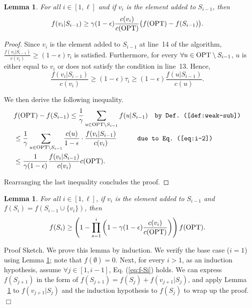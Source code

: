 \documentclass[10pt]{article} %
\newtheorem{lemma}[theorem]{Lemma}
\theoremstyle{remark}
\newcommand{\OPT}{{\rm OPT}}
\begin{document}
\begin{lemma}
\label{lem:marginal-gain}
For all $i \in [1,\ell]$ and if $v_i$ is the element added to $S_{i-1}$, then
\[ 
f(v_i|S_{i-1}) \geq \gamma(1-\epsilon) \frac{c(v_i)}{c(\OPT)} \big ( f(\OPT) - f(S_{i-1}) \big ). 
\]
\end{lemma}

\begin{proof} 
Since $v_i$ is the element added to $S_{i-1}$ at line~14 of the algorithm,
$\frac{f(v_i|S_{i-1})}{c(v_i)}\geq {(1-\epsilon)\tau_i}$ is satisfied. Furthermore, for every 
$\forall u\in \OPT \setminus S_{i-1}$, $u$ is either equal to $v_i$ or does not satisfy the condition in line~13. Hence, 
\begin{equation}
\frac{f(v_i|S_{i-1})}{c(v_i)}\geq {(1-\epsilon)\tau_i} \geq (1-\epsilon) \frac{f(u|S_{i-1})}{c(u)}.
\label{eq:i-2}
\end{equation}

We then derive the following inequality.
\begin{align*}
    & f(\OPT)-f(S_{i-1}) \leq \frac{1}{\gamma} \sum_{u\in \OPT \setminus S_{i-1}} f(u|S_{i-1}) \quad\mbox{\tt  by Def.~(\ref{def:weak-sub})} \\
    &\leq \frac{1}{\gamma} \sum_{u\in \OPT \setminus S_{i-1}} \frac{c(u)}{1-\epsilon} \cdot \frac{f(v_i|S_{i-1})}{c(v_i)}  \quad\quad\quad\mbox{\tt  due to Eq.~(\ref{eq:i-2})} \\
    &\leq \frac{1}{\gamma(1-\epsilon)} \frac{f(v_i|S_{i-1})}{c(v_i)} c(\OPT).
\end{align*}

Rearranging the last inequality concludes the proof.     
\end{proof}

\begin{lemma}
\label{lem:f-Si}
For all $i\in [1,\ell]$, if $v_i$ is the element added to $S_{i-1}$ and $f(S_{i})=f(S_{i-1} \cup \{v_i\})$, then
\begin{equation}
    \label{eq:f-Si}
    f(S_{i}) \geq \left(   1- \prod_{s=1}^{i} \left(1- \gamma(1-\epsilon) \frac{c(v_i)}{c(\OPT)} \right)   \right) f(\OPT).
\end{equation}
\end{lemma}

{\sc Proof Sketch.}
We prove this lemma by induction. We verify the base case ($i=1$) using Lemma \ref{lem:marginal-gain}; note that
$f(\emptyset) = 0$. Next, for every $i>1$, as an induction hypothesis, assume $\forall j \in [1, i-1]$, Eq. (\ref{eq:f-Si}) holds. We can express $f(S_{j+1})$ in the form of $f(S_{j+1}) = f(S_j)+f(v_{j+1}|S_j)$, and apply Lemma ~\ref{lem:marginal-gain} to $f(v_{j+1}|S_j)$ and the induction hypothesis to $f(S_j)$ to wrap up the proof. \hfill $\Box$
\end{document}
